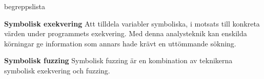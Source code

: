\begin{labeling}{begreppslista}
  \item [\textbf{Symbolisk exekvering}] Att tilldela variabler symboliska, i
      motsats till konkreta värden under programmets exekvering. Med denna
      analysteknik kan enskilda körningar ge information som annars hade krävt
      en uttömmande sökning.

    \item [\textbf{Symbolisk fuzzing}] Symbolisk fuzzing är en kombination av
    teknikerna symbolisk exekvering och fuzzing. 
    
\end{labeling}
